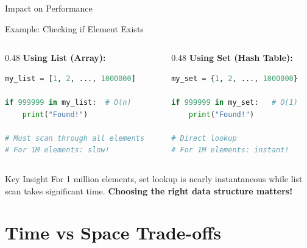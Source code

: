 \documentclass[aspectratio=169,xcolor=dvipsnames]{beamer}
\begin{document}
\begin{frame}[fragile]{Impact on Performance}
  \begin{exampleblock}{Example: Checking if Element Exists}
    \begin{columns}
      \begin{column}{0.48\textwidth}
        \textbf{Using List (Array):}
        \begin{lstlisting}[language=Python,basicstyle=\tiny\ttfamily]
my_list = [1, 2, ..., 1000000]

if 999999 in my_list:  # O(n)
    print("Found!")

# Must scan through all elements
# For 1M elements: slow!
        \end{lstlisting}
      \end{column}
      \begin{column}{0.48\textwidth}
        \textbf{Using Set (Hash Table):}
        \begin{lstlisting}[language=Python,basicstyle=\tiny\ttfamily]
my_set = {1, 2, ..., 1000000}

if 999999 in my_set:   # O(1)
    print("Found!")

# Direct lookup
# For 1M elements: instant!
        \end{lstlisting}
      \end{column}
    \end{columns}
  \end{exampleblock}

  \vspace{0.5cm}

  \begin{alertblock}{Key Insight}
    For 1 million elements, set lookup is nearly instantaneous while list scan takes significant time. \textbf{Choosing the right data structure matters!}
  \end{alertblock}
\end{frame}

\section{Time vs Space Trade-offs}
\end{document}
